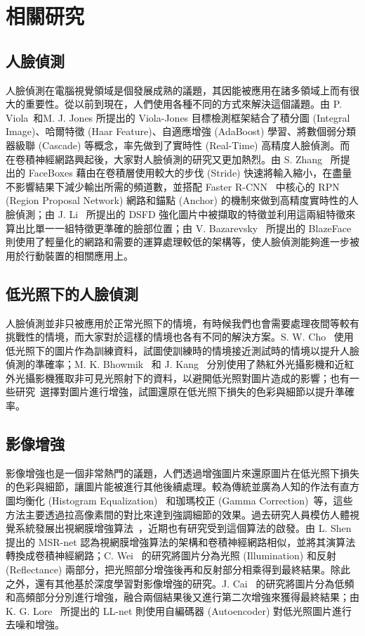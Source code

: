 \chapter{相關研究}
\label{c:related}

\section{人臉偵測}
人臉偵測在電腦視覺領域是個發展成熟的議題，其因能被應用在諸多領域上而有很大的重要性。從以前到現在，人們使用各種不同的方式來解決這個議題。由 P. Viola~和M. J. Jones\cite{viola2004robust} 所提出的 Viola-Jones 目標檢測框架結合了積分圖 (Integral Image)、哈爾特徵 (Haar Feature)、自適應增強 (AdaBoost) 學習、將數個弱分類器級聯 (Cascade) 等概念，率先做到了實時性 (Real-Time) 高精度人臉偵測。而在卷積神經網路興起後，大家對人臉偵測的研究又更加熱烈。由 S. Zhang~\cite{zhang2017faceboxes} 所提出的 FaceBoxes 藉由在卷積層使用較大的步伐 (Stride) 快速將輸入縮小，在盡量不影響結果下減少輸出所需的頻道數，並搭配 Faster R-CNN~\cite{ren2015faster} 中核心的 RPN (Region Proposal Network) 網路和錨點 (Anchor) 的機制來做到高精度實時性的人臉偵測；由 J. Li~\cite{li2019dsfd} 所提出的 DSFD 強化圖片中被擷取的特徵並利用這兩組特徵來算出比單一一組特徵更準確的臉部位置；由 V. Bazarevsky~\cite{bazarevsky2019blazeface} 所提出的 BlazeFace 則使用了輕量化的網路和需要的運算處理較低的架構等，使人臉偵測能夠進一步被用於行動裝置的相關應用上。

\section{低光照下的人臉偵測}
人臉偵測並非只被應用於正常光照下的情境，有時候我們也會需要處理夜間等較有挑戰性的情境，而大家對於這樣的情境也各有不同的解決方案。S. W. Cho~\cite{cho2018face} 使用低光照下的圖片作為訓練資料，試圖使訓練時的情境接近測試時的情境以提升人臉偵測的準確率；M. K. Bhowmik~\cite{bhowmik2011thermal} 和 J. Kang~\cite{kang2015face} 分別使用了熱紅外光攝影機和近紅外光攝影機獲取非可見光照射下的資料，以避開低光照對圖片造成的影響；也有一些研究~\cite{cho2018face, li2017real, yang2020advancing}選擇對圖片進行增強，試圖還原在低光照下損失的色彩與細節以提升準確率。

\section{影像增強}
影像增強也是一個非常熱門的議題，人們透過增強圖片來還原圖片在低光照下損失的色彩與細節，讓圖片能被進行其他後續處理。較為傳統並廣為人知的作法有直方圖均衡化 (Histogram Equalization)~\cite{gonzales2002digital} 和珈瑪校正 (Gamma Correction)~\cite{gonzales2002digital}等，這些方法主要透過拉高像素間的對比來達到強調細節的效果。過去研究人員模仿人體視覺系統發展出視網膜增強算法~\cite{land1977retinex}，近期也有研究受到這個算法的啟發。由 L. Shen~\cite{shen2017msr} 提出的 MSR-net 認為視網膜增強算法的架構和卷積神經網路相似，並將其演算法轉換成卷積神經網路；C. Wei~\cite{wei2018deep} 的研究將圖片分為光照 (Illumination) 和反射 (Reflectance) 兩部分，把光照部分增強後再和反射部分相乘得到最終結果。除此之外，還有其他基於深度學習對影像增強的研究。J. Cai~\cite{cai2018learning} 的研究將圖片分為低頻和高頻部分分別進行增強，融合兩個結果後又進行第二次增強來獲得最終結果；由K. G. Lore~\cite{lore2017llnet} 所提出的 LL-net 則使用自編碼器 (Autoencoder) 對低光照圖片進行去噪和增強。
